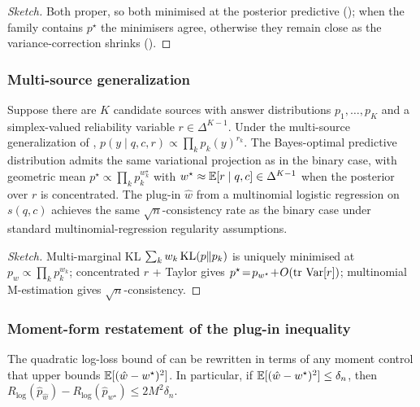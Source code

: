 \begin{proof}[Sketch]
Both proper, so both minimised at the posterior predictive
(); when the family contains $p^\star$
the minimisers agree, otherwise they remain close as the
variance-correction shrinks ().
\end{proof}

\subsubsection{Multi-source generalization}

\begin{proposition}
\label{prop:multi-source}
Suppose there are $K$ candidate sources with answer distributions
$p_1,\ldots,p_K$ and a simplex-valued reliability variable
$r\in\Delta^{K-1}$.  Under the multi-source generalization of
,
$p(y\mid q,c,r)\propto\prod_k p_k(y)^{r_k}$.  The Bayes-optimal
predictive distribution admits the same variational projection as in the
binary case, with geometric mean
$p^\star\!\propto\!\prod_k p_k^{w^\star_k}$ with
$w^\star\approx\mathbb{E}[r\mid q,c]\in\Delta^{K-1}$ when the posterior over $r$
is concentrated.  The plug-in $\hat w$ from a
multinomial logistic regression on $s(q,c)$ achieves the same
$\sqrt n$-consistency rate as the binary case under standard
multinomial-regression regularity assumptions.
\end{proposition}

\begin{proof}[Sketch]
Multi-marginal KL $\sum_k w_k\operatorname{KL}(p\|p_k)$ is uniquely minimised at
$p_w\!\propto\!\prod_k p_k^{w_k}$; concentrated $r$ + Taylor gives
$p^\star\!=\!p_{w^\star}\!+\!O(\mathrm{tr}\,\operatorname{Var}[r])$; multinomial
M-estimation gives $\sqrt n$-consistency.
\end{proof}

\subsubsection{Moment-form restatement of the plug-in inequality}

\begin{proposition}
\label{prop:lp-excess}
The quadratic log-loss bound of  can be
rewritten in terms of any moment control that upper bounds
$\mathbb{E}[(\hat w-w^\star)^2]$.  In particular, if
$\mathbb{E}[(\hat w-w^\star)^2]\le \delta_n$, then
$R_{\log}(\hat p_{\hat w})-R_{\log}(\hat p_{w^\star})\le 2M^2\delta_n$.
\end{proposition}

